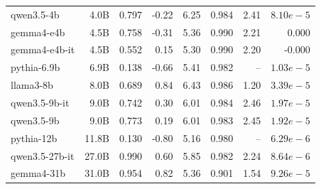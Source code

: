 \begin{tabular}{@{}lrrrrrrr@{}}
qwen3.5-4b & 4.0B & 0.797 & -0.22 & 6.25 & 0.984 & 2.41 & $8.10e-5$ \\
gemma4-e4b & 4.5B & 0.758 & -0.31 & 5.36 & 0.990 & 2.21 & 0.000 \\
gemma4-e4b-it & 4.5B & 0.552 & 0.15 & 5.30 & 0.990 & 2.20 & -0.000 \\
pythia-6.9b & 6.9B & 0.138 & -0.66 & 5.41 & 0.982 & -- & $1.03e-5$ \\
llama3-8b & 8.0B & 0.689 & 0.84 & 6.43 & 0.986 & 1.20 & $3.39e-5$ \\
qwen3.5-9b-it & 9.0B & 0.742 & 0.30 & 6.01 & 0.984 & 2.46 & $1.97e-5$ \\
qwen3.5-9b & 9.0B & 0.773 & 0.19 & 6.01 & 0.983 & 2.45 & $1.92e-5$ \\
pythia-12b & 11.8B & 0.130 & -0.80 & 5.16 & 0.980 & -- & $6.29e-6$ \\
qwen3.5-27b-it & 27.0B & 0.990 & 0.60 & 5.85 & 0.982 & 2.24 & $8.64e-6$ \\
gemma4-31b & 31.0B & 0.954 & 0.82 & 5.36 & 0.901 & 1.54 & $9.26e-5$ \\
\bottomrule
\end{tabular}